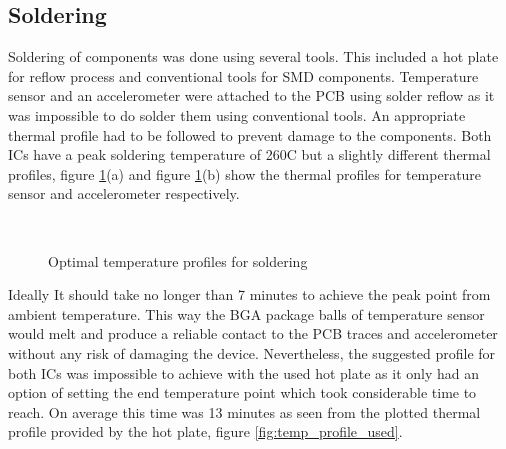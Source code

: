 \subsection{Soldering}
Soldering of components was done using several tools. This included a hot plate for reflow process and conventional tools for SMD components. Temperature sensor and an accelerometer were attached to the PCB using solder reflow as it was impossible to do solder them using conventional tools. An appropriate thermal profile had to be followed to prevent damage to the components. Both ICs have a peak soldering temperature of 260C but a slightly different thermal profiles, figure \ref{fig:temp_profile_optimal}(a) and figure  \ref{fig:temp_profile_optimal}(b) show the thermal profiles for temperature sensor and accelerometer respectively. 

\begin{figure}
\centering
\mbox{
\quad
{}
}
\caption{Optimal temperature profiles for soldering}
\label{fig:temp_profile_optimal}
\end{figure}

Ideally It should take no longer than 7 minutes to achieve the peak point from ambient temperature. This way the BGA package balls of temperature sensor would melt and produce a reliable contact to the PCB traces and accelerometer  without any risk of damaging the device. Nevertheless, the suggested profile for both ICs was impossible to achieve with the used hot plate as it only had an option of setting the end temperature point which took considerable time to reach. On average this time was 13 minutes as seen from the plotted thermal profile provided by the hot plate, figure \ref{fig:temp_profile_used}.

